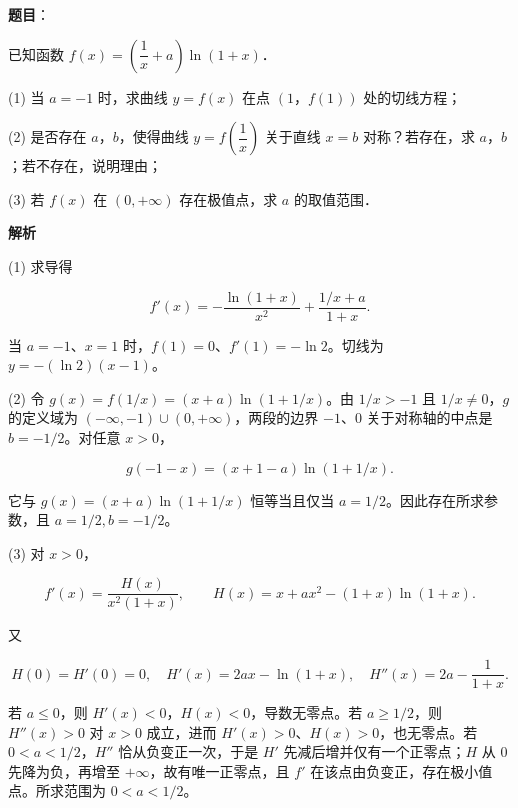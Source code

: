 \begin{answer}

\textbf{题目}：

已知函数 $f(x)=\left(\dfrac1x+a\right)\ln(1+x)$．

(1) 当 $a=-1$ 时，求曲线 $y=f(x)$ 在点 $(1\text{，}f(1))$ 处的切线方程；

(2) 是否存在 $a\text{，}b$，使得曲线 $y=f\left(\dfrac1x\right)$ 关于直线 $x=b$ 对称？若存在，求 $a\text{，}b$；若不存在，说明理由；

(3) 若 $f(x)$ 在 $(0,+\infty)$ 存在极值点，求 $a$ 的取值范围．

\textbf{解析}


(1) 求导得

\nopagebreak[4]
\[
f'(x)=-\frac{\ln(1+x)}{x^2}+\frac{1/x+a}{1+x}.
\]

当 $a=-1$、$x=1$ 时，$f(1)=0$、$f'(1)=-\ln2$。切线为 $y=-(\ln2)(x-1)$。


(2) 令 $g(x)=f(1/x)=(x+a)\ln(1+1/x)$。由 $1/x>-1$ 且 $1/x\ne0$，$g$ 的定义域为 $(-\infty,-1)\cup(0,+\infty)$，两段的边界 $-1$、$0$ 关于对称轴的中点是 $b=-1/2$。对任意 $x>0$，

\nopagebreak[4]
\[
g(-1-x)=(x+1-a)\ln(1+1/x).
\]

它与 $g(x)=(x+a)\ln(1+1/x)$ 恒等当且仅当 $a=1/2$。因此存在所求参数，且 $a=1/2,b=-1/2$。


(3) 对 $x>0$，

\nopagebreak[4]
\[
f'(x)=\frac{H(x)}{x^2(1+x)},\qquad
H(x)=x+ax^2-(1+x)\ln(1+x).
\]

又

\nopagebreak[4]
\[
H(0)=H'(0)=0,\quad H'(x)=2ax-\ln(1+x),\quad H''(x)=2a-\frac1{1+x}.
\]

若 $a\leqslant0$，则 $H'(x)<0$，$H(x)<0$，导数无零点。若 $a\geqslant1/2$，则 $H''(x)>0$ 对 $x>0$ 成立，进而 $H'(x)>0$、$H(x)>0$，也无零点。若 $0<a<1/2$，$H''$ 恰从负变正一次，于是 $H'$ 先减后增并仅有一个正零点；$H$ 从 $0$ 先降为负，再增至 $+\infty$，故有唯一正零点，且 $f'$ 在该点由负变正，存在极小值点。所求范围为 $0<a<1/2$。




\end{answer}
